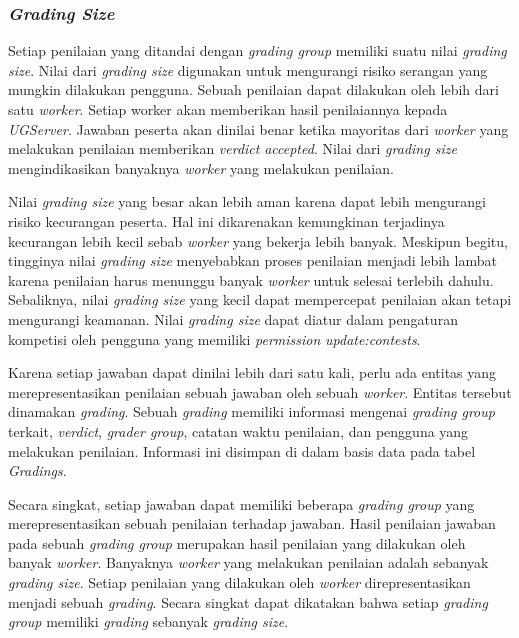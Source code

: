 \subsubsection{\textit{Grading Size}}

\par Setiap penilaian yang ditandai dengan \textit{grading group} memiliki suatu nilai \textit{grading size}. Nilai dari \textit{grading size} digunakan untuk mengurangi risiko serangan yang mungkin dilakukan pengguna. Sebuah penilaian dapat dilakukan oleh lebih dari satu \textit{worker}. Setiap worker akan memberikan hasil penilaiannya kepada \textit{UGServer}. Jawaban peserta akan dinilai benar ketika mayoritas dari \textit{worker} yang melakukan penilaian memberikan \textit{verdict} \textit{accepted}. Nilai dari \textit{grading size} mengindikasikan banyaknya \textit{worker} yang melakukan penilaian.

\par Nilai \textit{grading size} yang besar akan lebih aman karena dapat lebih mengurangi risiko kecurangan peserta. Hal ini dikarenakan kemungkinan terjadinya kecurangan lebih kecil sebab \textit{worker} yang bekerja lebih banyak. Meskipun begitu, tingginya nilai \textit{grading size} menyebabkan proses penilaian menjadi lebih lambat karena penilaian harus menunggu banyak \textit{worker} untuk selesai terlebih dahulu. Sebaliknya, nilai \textit{grading size} yang kecil dapat mempercepat penilaian akan tetapi mengurangi keamanan. Nilai \textit{grading size} dapat diatur dalam pengaturan kompetisi oleh pengguna yang memiliki \textit{permission} \textit{update:contests}.

\par Karena setiap jawaban dapat dinilai lebih dari satu kali, perlu ada entitas yang merepresentasikan penilaian sebuah jawaban oleh sebuah \textit{worker}. Entitas tersebut dinamakan \textit{grading}. Sebuah \textit{grading} memiliki informasi mengenai \textit{grading group} terkait, \textit{verdict}, \textit{grader group}, catatan waktu penilaian, dan pengguna yang melakukan penilaian. Informasi ini disimpan di dalam basis data pada tabel \textit{Gradings}.

\par Secara singkat, setiap jawaban dapat memiliki beberapa \textit{grading group} yang merepresentasikan sebuah penilaian terhadap jawaban. Hasil penilaian jawaban pada sebuah \textit{grading group} merupakan hasil penilaian yang dilakukan oleh banyak \textit{worker}. Banyaknya \textit{worker} yang melakukan penilaian adalah sebanyak \textit{grading size}. Setiap penilaian yang dilakukan oleh \textit{worker} direpresentasikan menjadi sebuah \textit{grading}. Secara singkat dapat dikatakan bahwa setiap \textit{grading group} memiliki \textit{grading} sebanyak \textit{grading size}.

